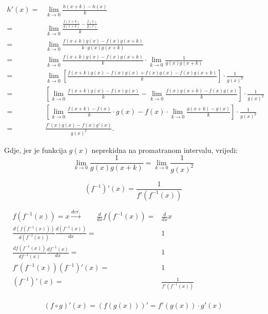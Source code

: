 \begin{align*}
    h'(x) =& \lim_{k\to 0} \frac{h(x+k)-h(x)}{k}\\
    =& \lim_{k\to 0} \frac{\frac{f(x+k)}{g(x+k)}-\frac{f(x)}{g(x)}}{k}\\
    =& \lim_{k\to 0} \frac{f(x+k)g(x)-f(x)g(x+k)}{k\cdot g(x)g(x+k)}\\
    =& \lim_{k\to 0} \frac{f(x+k)g(x)-f(x)g(x+k)}{k} \cdot \lim_{k\to 0}\frac{1}{g(x)g(x+k)}\\
    =& \lim_{k\to 0} \left[\frac{f(x+k)g(x) - f(x)g(x) + f(x)g(x) - f(x)g(x+k)}{k} \right] \cdot \frac{1}{g(x)^2} \\
    =& \left[\lim_{k\to 0} \frac{f(x+k)g(x) - f(x)g(x)}{k} - \lim_{k\to 0}\frac{f(x)g(x+k) - f(x)g(x)}{k} \right] \cdot \frac{1}{g(x)^2} \\
    =& \left[\lim_{k\to 0} \frac{f(x+k) - f(x)}{k} \cdot g(x) - f(x) \cdot \lim_{k\to 0}\frac{g(x+k) - g(x)}{k} \right] \cdot \frac{1}{g(x)^2} \\
    =& \frac{f'(x)g(x) - f(x)g'(x)}{g(x)^2}.
\end{align*}

Gdje, jer je funkcija $g(x)$ neprekidna na promatranom intervalu, vrijedi:
$$
\lim_{k\to 0}\frac{1}{g(x)g(x+k)} = \lim_{k\to 0}\frac{1}{g(x)^2}
$$

\begin{proposition}
    $$
        (f^{-1})'(x) = \frac{1}{f'(f^{-1}(x))}
    $$
\end{proposition}


\begin{align*}
    f(f^{-1}(x)) = x \xrightarrow{der.}\qquad \frac{d}{dx} f(f^{-1}(x)) =& \frac{d}{dx} x \phantom{f(f^{-1}(x)) = x \to\qquad}\\
    \frac{d\left( f(f^{-1}(x)) \right)}{d\left( f^{-1}(x) \right)} \frac{d\left(f^{-1}(x)\right)}{dx}
    =& 1 \\
    \frac{df(f^{-1}(x))}{df^{-1}(x)} \frac{df^{-1}(x)}{dx}
    =& 1 \\
    f'(f^{-1}(x))
    (f^{-1})'(x)
    =& 1\\
    (f^{-1})'(x)
    =& \frac{1}{f'(f^{-1}(x))}\\
\end{align*}

\begin{proposition}
    $$
        (f\circ g)'(x) = (f(g(x)))' = f'(g(x)) \cdot g'(x)
    $$
\end{proposition}


